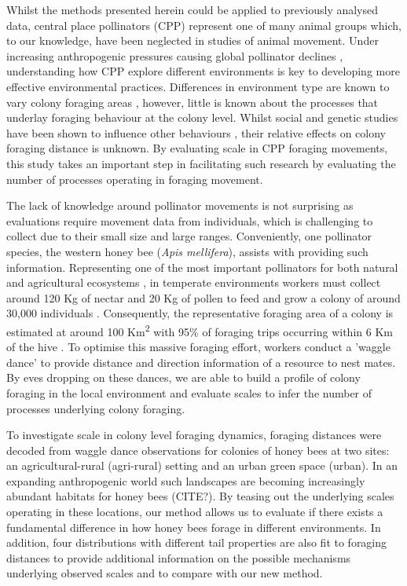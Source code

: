 \documentclass[11pt,usenames,dvipsnames,a4paper]{article}
\begin{document}
\begin{linenumbers}
Whilst the methods presented herein could be applied to previously analysed data, central place pollinators (CPP) represent one of many animal groups which, to our knowledge, have been neglected in studies of animal movement. Under increasing anthropogenic pressures causing global pollinator declines \citep{Powney2019}, understanding how CPP explore different environments is key to developing more effective environmental practices. Differences in environment type are known to vary colony foraging areas \citep{Lecocq2015, Samuelson2018}, however, little is known about the processes that underlay foraging behaviour at the colony level. Whilst social and genetic studies have been shown to influence other behaviours \citep{Fewell1993, Page1998, Sherman2002, Jones2004, Gruter2009}, their relative effects on colony foraging distance is unknown. By evaluating scale in CPP foraging movements, this study takes an important step in facilitating such research by evaluating the number of processes operating in foraging movement. 

The lack of knowledge around pollinator movements is not surprising as evaluations require movement data from individuals, which is challenging to collect due to their small size and large ranges. Conveniently, one pollinator species, the western honey bee (\textit{Apis mellifera}), assists with providing such information. Representing one of the most important pollinators for both natural and agricultural ecosystems \citep{Albrecht2018}, in temperate environments workers must collect around 120 Kg of nectar and 20 Kg of pollen to feed and grow a colony of around 30,000 individuals \citep{Seeley1995}. Consequently, the representative foraging area of a colony is estimated at around 100 Km\textsuperscript{2} with 95\% of foraging trips occurring within 6 Km of the hive \citep{Samuelson2017}. To optimise this massive foraging effort, workers conduct a 'waggle dance' to provide distance and direction information of a resource to nest mates. By eves dropping on these dances, we are able to build a profile of colony foraging in the local environment and evaluate scales to infer the number of processes underlying colony foraging.

To investigate scale in colony level foraging dynamics, foraging distances were decoded from waggle dance observations for colonies of honey bees at two sites: an agricultural-rural (agri-rural) setting and an urban green space (urban). In an expanding anthropogenic world such landscapes are becoming increasingly abundant habitats for honey bees (CITE?). By teasing out the underlying scales operating in these locations, our method allows us to evaluate if there exists a fundamental difference in how honey bees forage in different environments. In addition, four distributions with different tail properties are also fit to foraging distances to provide additional information on the possible mechanisms underlying observed scales and to compare with our new method.


\end{linenumbers}
\end{document}
